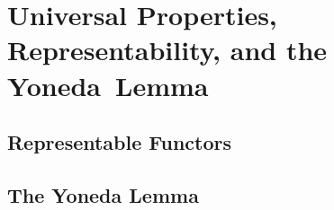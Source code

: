 \chapter{Universal Properties, Representability, and the Yoneda~Lemma}

\section{Representable Functors}






\section{The Yoneda Lemma}







